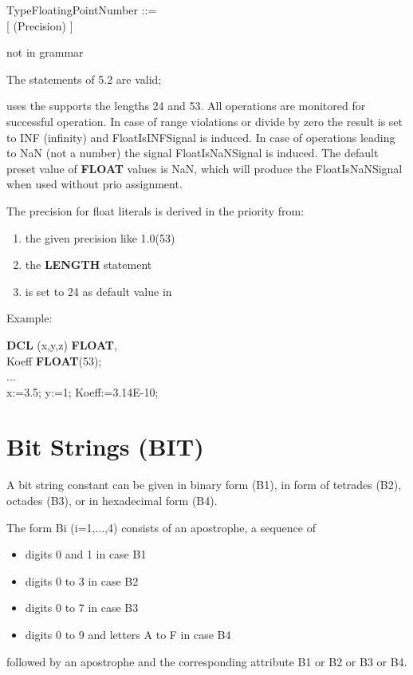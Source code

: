 \begin{front}
TypeFloatingPointNumber ::=\\
 [ (Precision) ]
\end{front}
\begin{grammar}
not in grammar
\end{grammar}

The statements of 5.2 are valid; 
\begin{added}
\OpenPEARL{} uses the supports the lengths 24 and 53.
All operations are monitored for successful operation.
In case of range violations or
divide by zero the result is set to INF (infinity) and
FloatIsINFSignal is induced.
In case of operations leading to NaN (not a number) the signal
FloatIsNaNSignal is induced.
The default preset value of {\bf FLOAT} values is NaN, which will produce
the FloatIsNaNSignal when used without prio assignment.

The precision for float literals is derived in the priority from: 
\begin{enumerate}
\item the given precision like 1.0(53)
\item the {\bf LENGTH} statement
\item is set to 24 as default value in \OpenPEARL
\end{enumerate}
\end{added}

Example:

{\bf DCL} (x,y,z) {\bf FLOAT},\\
\x Koeff {\bf FLOAT}(53);\\
... \\
x:=3.5; y:=1; Koeff:=3.14E-10;

\section{Bit Strings (BIT)}  %

A bit string constant can be given in binary form (B1), in form of
tetrades (B2), octades (B3), or in hexadecimal form (B4).

The form Bi (i=1,...,4) consists of an apostrophe, a sequence of
\begin{itemize}
\item digits 0 and 1 in case B1
\item digits 0 to 3 in case B2
\item digits 0 to 7 in case B3
\item digits 0 to 9 and letters A to F in case B4
\end{itemize}
followed by an apostrophe and the corresponding attribute B1 or B2 or
B3 or B4.

